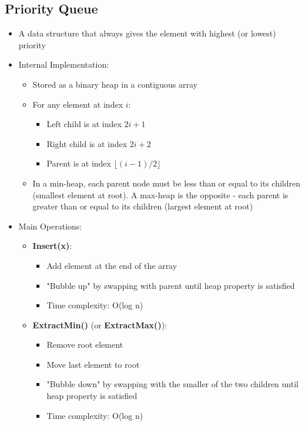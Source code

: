 \documentclass[11pt,a4paper]{article}
\begin{document}
\begin{multicols}{2}
\subsection{Priority Queue}
\begin{itemize}
    \item A data structure that always gives the element with highest (or lowest) priority
    \item Internal Implementation:
    \begin{itemize}
        \item Stored as a binary heap in a contiguous array
        \item For any element at index $i$:
        \begin{itemize}
            \item Left child is at index $2i + 1$
            \item Right child is at index $2i + 2$
            \item Parent is at index $\lfloor(i-1)/2\rfloor$
        \end{itemize}
        \item In a min-heap, each parent node must be less than or equal to its children (smallest element at root). A max-heap is the opposite - each parent is greater than or equal to its children (largest element at root)
    \end{itemize}
    \item Main Operations:
    \begin{itemize}
        \item \textbf{Insert(x)}:
        \begin{itemize}
            \item Add element at the end of the array
            \item "Bubble up" by swapping with parent until heap property is satisfied
            \item Time complexity: O(log n)
        \end{itemize}
        \item \textbf{ExtractMin()} (or \textbf{ExtractMax()}):
        \begin{itemize}
            \item Remove root element
            \item Move last element to root
            \item "Bubble down" by swapping with the smaller of the two children until heap property is satisfied
            \item Time complexity: O(log n)

\end{itemize}
\end{itemize}
\end{itemize}
\end{multicols}
\end{document}
